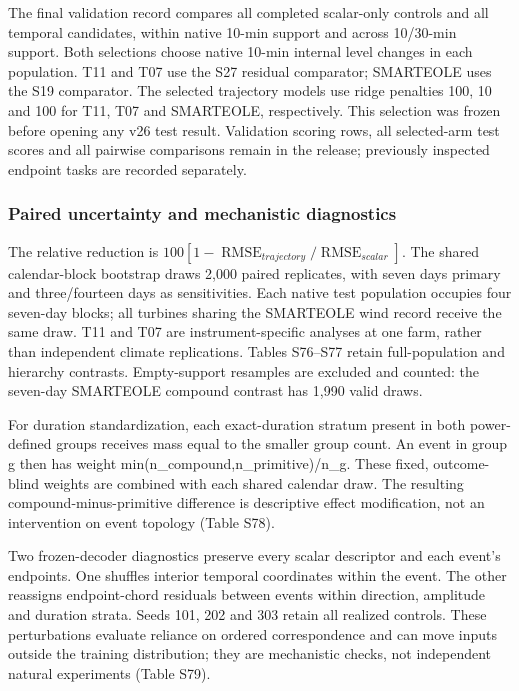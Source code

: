 \documentclass[a4paper,11pt]{article}
\begin{document}
The final validation record compares all completed scalar-only controls and all temporal candidates, within native 10-min support and across 10/30-min support. Both selections choose native 10-min internal level changes in each population. T11 and T07 use the S27 residual comparator; SMARTEOLE uses the S19 comparator. The selected trajectory models use ridge penalties 100, 10 and 100 for T11, T07 and SMARTEOLE, respectively. This selection was frozen before opening any v26 test result. Validation scoring rows, all selected-arm test scores and all pairwise comparisons remain in the release; previously inspected endpoint tasks are recorded separately.

\subsubsection{Paired uncertainty and mechanistic diagnostics}\label{paired-uncertainty-and-mechanistic-diagnostics}

The relative reduction is \(100[1-\operatorname{RMSE}_{trajectory}/\operatorname{RMSE}_{scalar}]\). The shared calendar-block bootstrap draws 2,000 paired replicates, with seven days primary and three/fourteen days as sensitivities. Each native test population occupies four seven-day blocks; all turbines sharing the SMARTEOLE wind record receive the same draw. T11 and T07 are instrument-specific analyses at one farm, rather than independent climate replications. Tables S76--S77 retain full-population and hierarchy contrasts. Empty-support resamples are excluded and counted: the seven-day SMARTEOLE compound contrast has 1,990 valid draws.

For duration standardization, each exact-duration stratum present in both power-defined groups receives mass equal to the smaller group count. An event in group g then has weight min(n\_compound,n\_primitive)/n\_g. These fixed, outcome-blind weights are combined with each shared calendar draw. The resulting compound-minus-primitive difference is descriptive effect modification, not an intervention on event topology (Table S78).

Two frozen-decoder diagnostics preserve every scalar descriptor and each event's endpoints. One shuffles interior temporal coordinates within the event. The other reassigns endpoint-chord residuals between events within direction, amplitude and duration strata. Seeds 101, 202 and 303 retain all realized controls. These perturbations evaluate reliance on ordered correspondence and can move inputs outside the training distribution; they are mechanistic checks, not independent natural experiments (Table S79).
\end{document}
